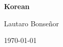 \begin{titlepage}
    \centering
    \vspace*{2cm}
    {\Huge\bfseries Korean\par}
    \vspace{1.5cm}
    {\Large Lautaro Bonseñor\par}
    \vfill
    {\large \today\par}
\end{titlepage}